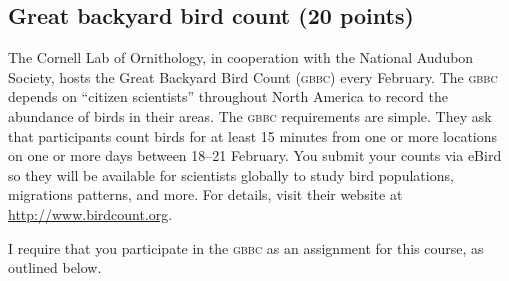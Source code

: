 \documentclass[11pt]{article}
\begin{document}
\thispagestyle{plain}

\subsection*{Great backyard bird count (20 points)}

The Cornell Lab of Ornithology, in cooperation with the National Audubon Society, hosts the Great Backyard Bird Count \textsc{(gbbc)} every February. The \textsc{gbbc} depends on ``citizen scientists'' throughout North America to record the abundance of birds in their areas. The \textsc{gbbc} requirements are simple. They ask that participants count birds for at least 15 minutes from one or more locations on one or more days between 18--21 February. You submit your counts via eBird so they will be available for scientists globally to study bird populations, migrations patterns, and more.  For details, visit their website at \url{http://www.birdcount.org}.\medskip

I require that you participate in the \textsc{gbbc} as an assignment for this course, as outlined below.
\end{document}
